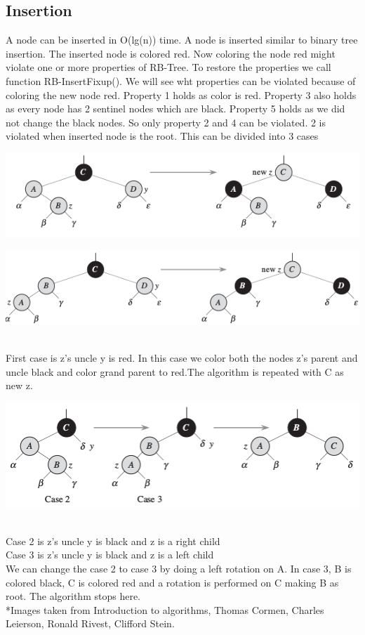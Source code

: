 \documentclass[BTech]{iitmdiss}
\begin{document}
\subsection{Insertion}
A node can be inserted in O(lg(n)) time. A node is inserted similar to binary tree insertion. The inserted node is colored red. Now coloring the node red might violate one or more properties of RB-Tree. To restore the properties we call function RB-InsertFixup(). We will see wht properties can be violated because of coloring the new node red. Property 1 holds as color is red. Property 3 also holds as every node has 2 sentinel nodes which are black. Property 5 holds as we did not change the black nodes. So only property 2 and 4 can be violated. 2 is violated when inserted node is the root. This can be divided into 3 cases\\
\centerline{\includegraphics{cse1.png}}
\centerline{\includegraphics{case1.png}}\\
First case is z's uncle y is red. In this case we color both the nodes z's parent and uncle black and color grand parent to red.The algorithm is repeated with C as new z.\\
\centerline{\includegraphics{case2,3.png}}\\
Case 2 is z's uncle y is black and z is a right child\\
Case 3 is z's uncle y is black and z is a left child\\
We can change the case 2 to case 3 by doing a left rotation on A. In case 3, B is colored black, C is colored red and a rotation is performed on C making B as root. The algorithm stops here.\\
*Images taken from Introduction to algorithms, Thomas Cormen, Charles Leierson, Ronald Rivest,  Clifford Stein.
\end{document}

